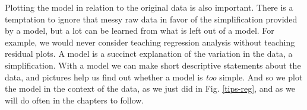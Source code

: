 Plotting the model in relation to the original data is also important.
There is a temptation to ignore that messy raw data in favor of
the simplification provided by a model, but a lot can be learned from
what is left out of a model.  For example, we would never consider
teaching regression analysis without teaching residual plots.  A model
is a succinct explanation of the variation in the data, a
simplification. With a model we can make short descriptive statements
about the data, and pictures help us find out whether a model is {\em too}
simple.  And so we plot the model in the context of the data, as we
just did in Fig. \ref{tips-reg}, and as we will do often in the
chapters to follow.




